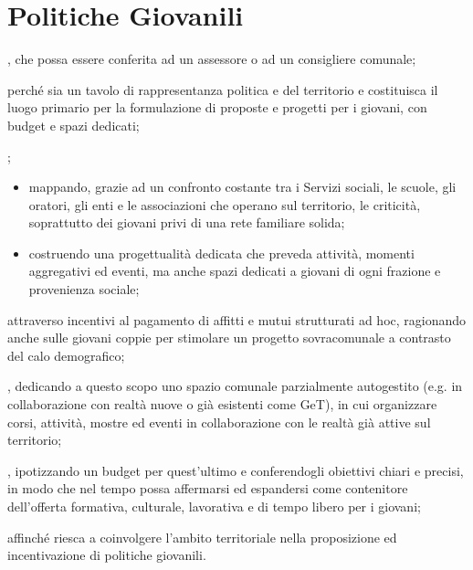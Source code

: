 \section{Politiche Giovanili}
, che possa essere conferita ad un assessore o ad un consigliere comunale;

 perché sia un tavolo di rappresentanza politica e del territorio e costituisca il luogo primario per la formulazione di proposte e progetti per i giovani, con budget e spazi dedicati; 

; 

\begin{itemize}
  \item mappando, grazie ad un confronto costante tra i Servizi sociali, le scuole, gli oratori, gli enti e le associazioni che operano sul territorio, le criticità, soprattutto dei giovani privi di una rete familiare solida;
  \item costruendo una progettualità dedicata che preveda attività, momenti aggregativi ed eventi, ma anche spazi dedicati a giovani di ogni frazione e provenienza sociale;
\end{itemize}

 attraverso incentivi al pagamento di affitti e mutui strutturati ad hoc, ragionando anche sulle giovani coppie per stimolare un progetto sovracomunale a contrasto del calo demografico;

, dedicando a questo scopo uno spazio comunale parzialmente autogestito (e.g. in collaborazione con realtà nuove o già esistenti come GeT), in cui organizzare corsi, attività, mostre ed eventi in collaborazione con le realtà già attive sul territorio;

, ipotizzando un budget per quest'ultimo e conferendogli obiettivi chiari e precisi, in modo che nel tempo possa affermarsi ed espandersi come contenitore dell'offerta formativa, culturale, lavorativa e di tempo libero per i giovani;

 affinché riesca a coinvolgere l'ambito territoriale nella proposizione ed incentivazione di politiche giovanili.
